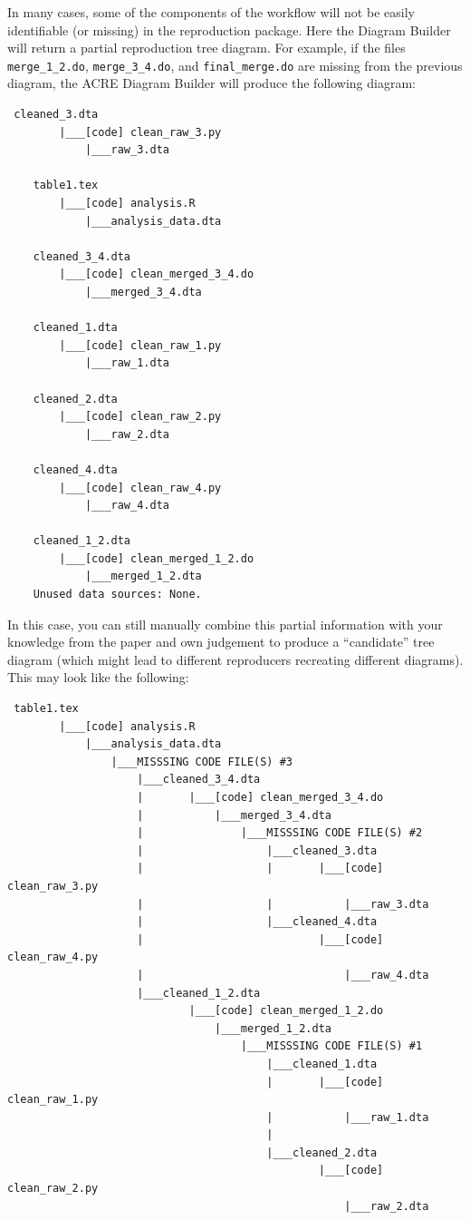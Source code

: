 \documentclass[]{book}
\begin{document}
In many cases, some of the components of the workflow will not be easily identifiable (or missing) in the reproduction package. Here the Diagram Builder will return a partial reproduction tree diagram. For example, if the files \texttt{merge\_1\_2.do}, \texttt{merge\_3\_4.do}, and \texttt{final\_merge.do} are missing from the previous diagram, the ACRE Diagram Builder will produce the following diagram:

\begin{verbatim}
 cleaned_3.dta
        |___[code] clean_raw_3.py
            |___raw_3.dta

    table1.tex
        |___[code] analysis.R
            |___analysis_data.dta

    cleaned_3_4.dta
        |___[code] clean_merged_3_4.do
            |___merged_3_4.dta

    cleaned_1.dta
        |___[code] clean_raw_1.py
            |___raw_1.dta

    cleaned_2.dta
        |___[code] clean_raw_2.py
            |___raw_2.dta

    cleaned_4.dta
        |___[code] clean_raw_4.py
            |___raw_4.dta

    cleaned_1_2.dta
        |___[code] clean_merged_1_2.do
            |___merged_1_2.dta
    Unused data sources: None.
\end{verbatim}

In this case, you can still manually combine this partial information with your knowledge from the paper and own judgement to produce a ``candidate'' tree diagram (which might lead to different reproducers recreating different diagrams). This may look like the following:

\begin{verbatim}
 table1.tex
        |___[code] analysis.R
            |___analysis_data.dta
                |___MISSSING CODE FILE(S) #3
                    |___cleaned_3_4.dta
                    |       |___[code] clean_merged_3_4.do
                    |           |___merged_3_4.dta
                    |               |___MISSSING CODE FILE(S) #2
                    |                   |___cleaned_3.dta
                    |                   |       |___[code] clean_raw_3.py
                    |                   |           |___raw_3.dta    
                    |                   |___cleaned_4.dta
                    |                           |___[code] clean_raw_4.py
                    |                               |___raw_4.dta
                    |___cleaned_1_2.dta
                            |___[code] clean_merged_1_2.do
                                |___merged_1_2.dta
                                    |___MISSSING CODE FILE(S) #1
                                        |___cleaned_1.dta
                                        |       |___[code] clean_raw_1.py
                                        |           |___raw_1.dta
                                        |   
                                        |___cleaned_2.dta
                                                |___[code] clean_raw_2.py
                                                    |___raw_2.dta
\end{verbatim}
\end{document}
